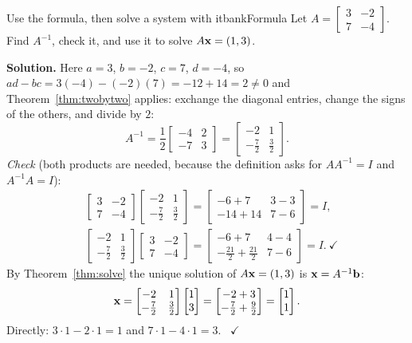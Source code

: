 \documentclass[11pt]{article}
\begin{document}
\begin{exmp}{Use the formula, then solve a system with it}{bankFormula}
Let $A=\begin{bmatrix}3&-2\\7&-4\end{bmatrix}$. Find $A^{-1}$, check it, and use it to solve $A\mathbf{x}=(1,3)$.

\textbf{Solution.} Here $a=3$, $b=-2$, $c=7$, $d=-4$, so $ad-bc=3(-4)-(-2)(7)=-12+14=2\neq0$ and Theorem~\ref{thm:twobytwo} applies: exchange the diagonal entries, change the signs of the others, and divide by $2$:
\[
A^{-1}=\frac12\begin{bmatrix}-4&2\\-7&3\end{bmatrix}=\begin{bmatrix}-2&1\\-\tfrac72&\tfrac32\end{bmatrix}.
\]
\emph{Check} (both products are needed, because the definition asks for $AA^{-1}=I$ and $A^{-1}A=I$):
\begin{align*}
&\begin{bmatrix}3&-2\\7&-4\end{bmatrix}\begin{bmatrix}-2&1\\-\tfrac72&\tfrac32\end{bmatrix}=\begin{bmatrix}-6+7&3-3\\-14+14&7-6\end{bmatrix}=I,\\
&\begin{bmatrix}-2&1\\-\tfrac72&\tfrac32\end{bmatrix}\begin{bmatrix}3&-2\\7&-4\end{bmatrix}=\begin{bmatrix}-6+7&4-4\\-\tfrac{21}2+\tfrac{21}2&7-6\end{bmatrix}=I.\ \checkmark
\end{align*}
By Theorem~\ref{thm:solve} the unique solution of $A\mathbf{x}=(1,3)$ is $\mathbf{x}=A^{-1}\mathbf{b}$:
\[
\mathbf{x}=\begin{bmatrix}-2&1\\-\tfrac72&\tfrac32\end{bmatrix}\begin{bmatrix}1\\3\end{bmatrix}=\begin{bmatrix}-2+3\\-\tfrac72+\tfrac92\end{bmatrix}=\begin{bmatrix}1\\1\end{bmatrix}.
\]
Directly: $3\cdot1-2\cdot1=1$ and $7\cdot1-4\cdot1=3$. \ $\checkmark$


\end{exmp}
\end{document}
